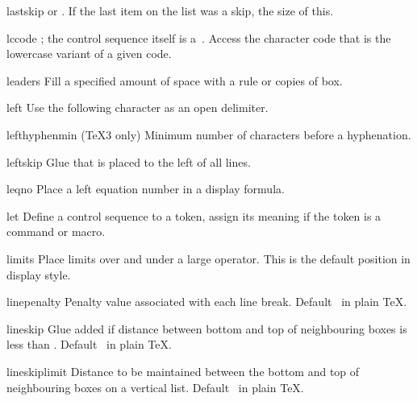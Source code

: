 \item lastskip
       or .
      If the last item on the list was a skip, the size of this.

\item lccode
      ; the control sequence itself
      is a~.
      Access the
      character code that is the lowercase variant of a given code.

\item leaders
      Fill a specified amount of space with a rule or copies of box.

\item left
      Use the following character as an open delimiter.

\item lefthyphenmin
      (\TeX3 only)
      Minimum number of characters before a hyphenation.

\item leftskip
      Glue that is placed to the left of all lines.

\item leqno
      Place a left equation number in a display formula.

\item let
      Define a control sequence to a token, assign its meaning
      if the token is a command or macro. 

\item limits
      Place limits over and under a large operator.
      This is the default position in display style.

\item linepenalty
      Penalty value associated with each line break. 
      Default~ in plain \TeX.

\item lineskip 
      Glue added if distance between bottom and top of neighbouring boxes 
      is less than .
      Default~\n{1pt} in plain \TeX.

\item lineskiplimit
      Distance to be maintained between the bottom and top of 
      neighbouring boxes on a vertical list.
      Default~\n{0pt} in plain \TeX.

